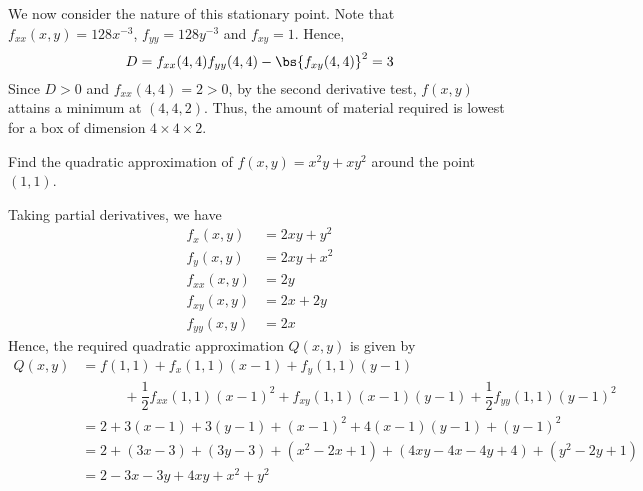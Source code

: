\documentclass{echw}
\begin{document}
        We now consider the nature of this stationary point. Note that $f_{xx}(x, y) = 128x^{-3}$, $f_{yy} = 128y^{-3}$ and $f_{xy} = 1$. Hence, \[D = f_{xx}(4, 4)f_{yy}(4, 4) - \bs{f_{xy}(4, 4)}^2 = 3\] Since $D > 0$ and $f_{xx}(4, 4) = 2 > 0$, by the second derivative test, $f(x, y)$ attains a minimum at $(4, 4, 2)$. Thus, the amount of material required is lowest for a box of dimension $4 \times 4 \times 2$.


    \problem{}
        Find the quadratic approximation of $f(x, y) = x^2 y + xy^2$ around the point $(1, 1)$.

    \solution
        Taking partial derivatives, we have
        \begin{align*}
            f_x(x, y) &= 2xy + y^2\\
            f_y(x, y) &= 2xy + x^2\\
            f_{xx}(x, y) &= 2y\\
            f_{xy}(x, y) &= 2x + 2y\\
            f_{yy}(x, y) &= 2x
        \end{align*}
        Hence, the required quadratic approximation $Q(x, y)$ is given by
        \begin{align*}
            Q(x, y) &= f(1, 1) + f_x(1, 1)(x-1) + f_y(1, 1)(y-1)\\
            & \hspace{3em} + \dfrac12 f_{xx}(1, 1)(x-1)^2 + f_{xy}(1, 1)(x-1)(y-1) + \dfrac12 f_{yy}(1, 1)(y-1)^2\\
            &= 2 + 3(x - 1) + 3(y - 1) + (x-1)^2 + 4(x-1)(y-1) + (y-1)^2\\
            &= 2 + (3x-3) + (3y-3) + (x^2 - 2x + 1) + (4xy - 4x - 4y + 4) + (y^2 - 2y + 1)\\
            &= 2 - 3x - 3y + 4xy + x^2 + y^2
        \end{align*}

\end{document}
